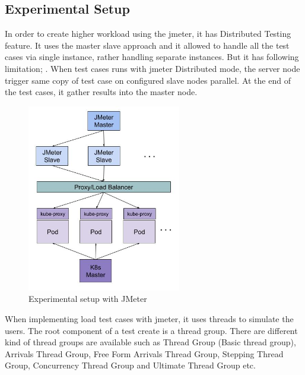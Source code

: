 \subsection{Experimental Setup}
In order to create higher workload using the \acrshort{jmeter}, it has Distributed Testing feature. It uses the master slave approach and it allowed to handle all the test cases via single instance, rather handling separate instances. But it has following limitation;
. When test cases runs with \acrshort{jmeter} Distributed mode, the server node trigger same copy of test case on configured slave nodes parallel. At the end of the test cases, it gather results into the master node.

\begin{figure}[htp]
    \centering
    \includegraphics[width=0.6\textwidth]{results/work_load/experimental_setup_v3.jpg}
    \caption{Experimental setup with JMeter}
    \label{fi:experimental_setup}
\end{figure}

When implementing load test cases with \acrshort{jmeter}, it uses threads to simulate the users. The root component of a test create is a thread group. There are different kind of thread groups are available such as Thread Group (Basic thread group), Arrivals Thread Group, Free Form Arrivals Thread Group, Stepping Thread Group, Concurrency Thread Group and Ultimate Thread Group etc.


